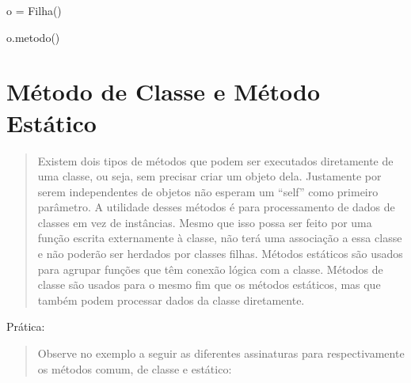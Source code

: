 \documentclass[letterpaper,10pt,brazil]{sphinxmanual}
\begin{document}
o = Filha()

o.metodo()


\chapter{Método de Classe e Método Estático}
\label{\detokenize{content/staticmethod_classmethod:metodo-de-classe-e-metodo-estatico}}\label{\detokenize{content/staticmethod_classmethod::doc}}\begin{quote}

Existem dois tipos de métodos que podem ser executados diretamente de uma classe, ou seja, sem precisar criar um objeto dela. Justamente por serem independentes de objetos não esperam um “self” como primeiro parâmetro.
A utilidade desses métodos é para processamento de dados de classes em vez de instâncias.
Mesmo que isso possa ser feito por uma função escrita externamente à classe, não terá uma associação a essa classe e não poderão ser herdados por classes filhas.
Métodos estáticos são usados para agrupar funções que têm conexão lógica com a classe.
Métodos de classe são usados para o mesmo fim que os métodos estáticos, mas que também podem processar dados da classe diretamente.
\end{quote}

Prática:
\begin{quote}

Observe no exemplo a seguir as diferentes assinaturas para respectivamente os métodos comum, de classe e estático:
\end{quote}
\end{document}
